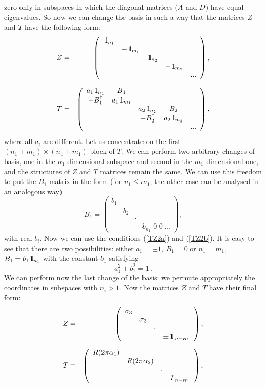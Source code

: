 \documentclass[a4paper,12pt]{article}
\def\id{{\,\,{\rm l}\!\!\!1}}
\begin{document}
zero only in subspaces in which the diagonal matrices ($A$ and $D$)
have equal eigenvalues. So now we can change the basis in such a way
that the matrices $Z$ and $T$ have the following form:
\begin{eqnarray}
Z&=&\left(
\begin{array}{ccccc}
\id_{n_1}&&&&\\
&-\id_{m_1}&&&\\
&&\id_{n_2}&&\\
&&&-\id_{m_2}&\\
&&&&...
\end{array}
\right)
,\\[6pt]
T&=&\left(
\begin{array}{ccccc}
a_1\id_{n_1}&B_1&&&\\
-B_1^\dagger&a_1\id_{m_1}&&&\\
&&a_2\id_{n_2}&B_2&\\
&&-B_2^\dagger&a_2\id_{m_2}&\\
&&&&...
\end{array}
\right)
,
\label{Tblock1}
\end{eqnarray}
where all $a_i$ are different. 
Let us concentrate on the first $(n_1+m_1)\times(n_1+m_1)$ block of
$T$. We can perform two arbitrary changes of basis, one in the $n_1$ 
dimensional subspace and second in the $m_1$ dimensional one, and the
structures of $Z$ and $T$ matrices remain the same. We can use this
freedom to put the $B_1$ matrix in the form (for $n_1\leq m_1$; the
other case can be analysed in an analogous way)
\begin{equation}
B_1=\left(
\begin{array}{cccc}
b_1 & & &\\
& b_2 & & \\
& & \cdot & \\
& & & b_{n_1}\,\,0\,\,0\,...
\end{array}
\right)
,
\end{equation}
with real $b_i$. Now we can use the conditions (\ref{TZ2a}) and
(\ref{TZ2b}). It is easy to see that there are two possibilities:
either $a_1=\pm1$, $B_1=0$ or $n_1=m_1$, $B_1=b_1\id_{n_1}$
with the constant $b_1$ satisfying
\begin{equation}
a_1^2+b_1^2=1
\,.
\end{equation}
We can perform now the last change of the basis: we permute
appropriately the coordinates in subspaces with $n_i>1$. Now the
matrices $Z$ and $T$ have their final form:
\begin{eqnarray}
Z&=&\left(
\begin{array}{cccc}
\sigma_3 & & &\\
& \sigma_3 & & \\
& & \cdot & \\
& & & \pm\id_{|n-m|}
\end{array}
\right)
,\\[6pt]
T&=&\left(
\begin{array}{cccc}
R(2\pi\alpha_1) & & &\\
& R(2\pi\alpha_2) & & \\
& & \cdot & \\
& & & I_{|n-m|}
\end{array}
\right)
,
\label{Tfinalform}
\end{eqnarray}
\end{document}
